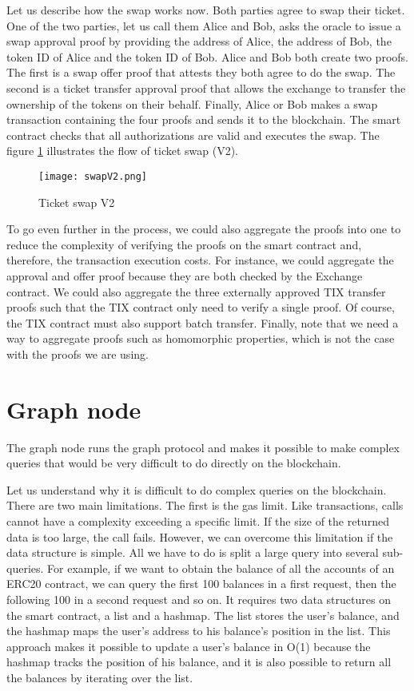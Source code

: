 \documentclass[a4paper,11pt,oneside]{report}
\begin{document}
Let us describe how the swap works now. Both parties agree to swap their ticket. One of the two parties, let us call them Alice and Bob, asks the oracle to issue a swap approval proof by providing the address of Alice, the address of Bob, the token ID of Alice and the token ID of Bob. Alice and Bob both create two proofs. The first is a swap offer proof that attests they both agree to do the swap. The second is a ticket transfer approval proof that allows the exchange to transfer the ownership of the tokens on their behalf. Finally, Alice or Bob makes a swap transaction containing the four proofs and sends it to the blockchain. The smart contract checks that all authorizations are valid and executes the swap. The figure \hyperref[fig:swapV2]{ \ref{fig:swapV2}} illustrates the flow of ticket swap (V2).

\begin{figure}[h!] 
  \centering
  \texttt{[image: swapV2.png]}
  \caption{Ticket swap V2}
  \label{fig:swapV2}
\end{figure}

To go even further in the process, we could also aggregate the proofs into one to reduce the complexity of verifying the proofs on the smart contract and, therefore, the transaction execution costs. For instance, we could aggregate the approval and offer proof because they are both checked by the Exchange contract. We could also aggregate the three externally approved TIX transfer proofs such that the TIX contract only need to verify a single proof. Of course, the TIX contract must also support batch transfer. Finally, note that we need a way to aggregate proofs such as homomorphic properties, which is not the case with the proofs we are using.

\section{Graph node}
The graph node runs the graph protocol and makes it possible to make complex queries that would be very difficult to do directly on the blockchain.

Let us understand why it is difficult to do complex queries on the blockchain. There are two main limitations. The first is the gas limit. Like transactions, calls cannot have a complexity exceeding a specific limit. If the size of the returned data is too large, the call fails. However, we can overcome this limitation if the data structure is simple. All we have to do is split a large query into several sub-queries. For example, if we want to obtain the balance of all the accounts of an ERC20 contract, we can query the first 100 balances in a first request, then the following 100 in a second request and so on. It requires two data structures on the smart contract, a list and a hashmap. The list stores the user's balance, and the hashmap maps the user's address to his balance's position in the list. This approach makes it possible to update a user's balance in O(1) because the hashmap tracks the position of his balance, and it is also possible to return all the balances by iterating over the list.
\end{document}
